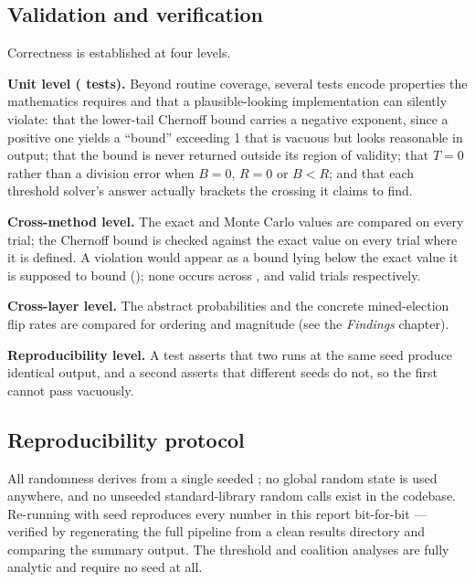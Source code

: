 \subsection{Validation and verification}
\label{sec:method-validation}

Correctness is established at four levels.

\textbf{Unit level (\TestCount{} tests).} Beyond routine coverage, several tests
encode properties the mathematics requires and that a plausible-looking
implementation can silently violate: that the lower-tail Chernoff bound
carries a negative exponent, since a positive one yields a ``bound''
exceeding 1 that is vacuous but looks reasonable in output; that the
bound is never returned outside its region of validity; that $T = 0$
rather than a division error when $B = 0$, $R = 0$ or $B < R$; and that
each threshold solver's answer actually brackets the crossing it claims
to find.

\textbf{Cross-method level.} The exact and Monte Carlo values are
compared on every trial; the Chernoff bound is checked against the
exact value on every trial where it is defined. A violation would
appear as a bound lying below the exact value it is supposed to bound
(); none occurs across \BriberyChernoffValid{},
\SybilChernoffValid{} and \BallotStuffingChernoffValid{} valid trials
respectively.

\textbf{Cross-layer level.} The abstract probabilities and the concrete
mined-election flip rates are compared for ordering and magnitude
(see the \emph{Findings} chapter).

\textbf{Reproducibility level.} A test asserts that two runs at the same
seed produce identical output, and a second asserts that different
seeds do not, so the first cannot pass vacuously.

\subsection{Reproducibility protocol}
\label{sec:reproducibility}

All randomness derives from a single seeded
; no global random state is used anywhere,
and no unseeded standard-library random calls exist in the codebase.
Re-running with seed \Seed{} reproduces every number in this report
bit-for-bit --- verified by regenerating the full pipeline from a clean
results directory and comparing the summary output. The threshold and
coalition analyses are fully analytic and require no seed at all.


